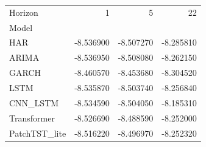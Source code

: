 \begin{tabular}{lrrr}
\toprule
Horizon & 1 & 5 & 22 \\
Model &  &  &  \\
\midrule
HAR & -8.536900 & -8.507270 & -8.285810 \\
ARIMA & -8.536950 & -8.508080 & -8.262150 \\
GARCH & -8.460570 & -8.453680 & -8.304520 \\
LSTM & -8.535870 & -8.503740 & -8.256840 \\
CNN_LSTM & -8.534590 & -8.504050 & -8.185310 \\
Transformer & -8.526690 & -8.488590 & -8.252000 \\
PatchTST_lite & -8.516220 & -8.496970 & -8.252320 \\
\bottomrule
\end{tabular}
